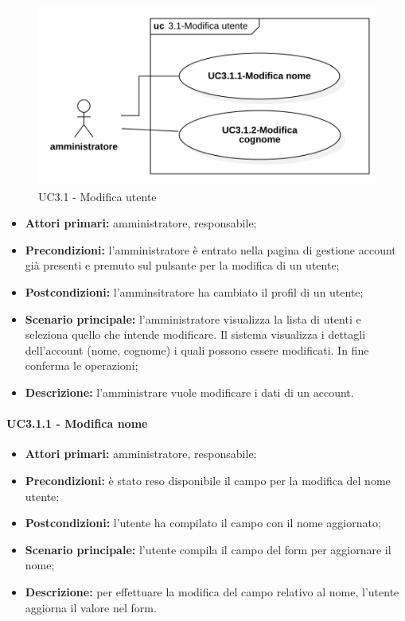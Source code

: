 \begin{figure}[H]
	\centering
	\includegraphics[scale=0.52]{res/images/uc3-1.png}
	\caption{UC3.1 - Modifica utente}
\end{figure}
\begin{itemize}
	\item 	\textbf{Attori primari:} amministratore, responsabile;
	\item 	\textbf{Precondizioni:} l'amministratore è entrato nella pagina di gestione account già presenti e premuto sul pulsante per la modifica di un utente;
	\item 	\textbf{Postcondizioni:} l'amminsitratore ha cambiato il profil di un utente;
	\item 	\textbf{Scenario principale:} l'amministratore visualizza la lista di utenti e seleziona quello che intende modificare. Il sistema visualizza i dettagli dell'account (nome, cognome) i quali possono essere modificati. In fine conferma le operazioni;
	\item 	\textbf{Descrizione:} l'amministrare vuole modificare i dati di un account.

\end{itemize}

\paragraph{UC3.1.1 - Modifica nome}

\begin{itemize}
	\item 	\textbf{Attori primari:} amministratore, responsabile;
	\item 	\textbf{Precondizioni:} è stato reso disponibile il campo per la modifica del nome utente;
	\item 	\textbf{Postcondizioni:}  l'utente ha compilato il campo con il nome aggiornato;
	\item 	\textbf{Scenario principale:} l'utente compila il campo del form per aggiornare il nome;
	\item 	\textbf{Descrizione:} per effettuare la modifica del campo relativo al nome, l'utente aggiorna il valore nel form.
\end{itemize}

